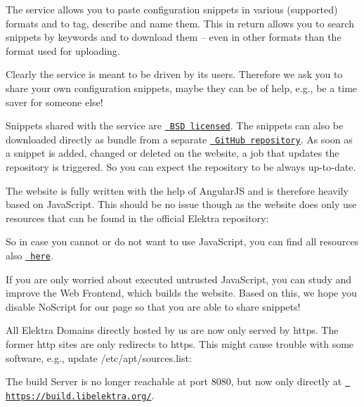 The service allows you to paste configuration snippets in various (supported) formats and to tag, describe and name them. This in return allows you to search snippets by keywords and to download them -- even in other formats than the format used for uploading.

Clearly the service is meant to be driven by its users. Therefore we ask you to share your own configuration snippets, maybe they can be of help, e.\+g., be a time saver for someone else!

Snippets shared with the service are \href{https://www.libelektra.org/devgettingstarted/license}{\texttt{ B\+SD licensed}}. The snippets can also be downloaded directly as bundle from a separate \href{https://github.com/ElektraInitiative/snippets}{\texttt{ Git\+Hub repository}}. As soon as a snippet is added, changed or deleted on the website, a job that updates the repository is triggered. So you can expect the repository to be always up-\/to-\/date.

The website is fully written with the help of Angular\+JS and is therefore heavily based on Java\+Script. This should be no issue though as the website does only use resources that can be found in the official Elektra repository\+:


\begin{DoxyEnumerate}
\item So in case you cannot or do not want to use Java\+Script, you can find all resources also \href{https://git.libelektra.org}{\texttt{ here}}.
\item If you are only worried about executed untrusted Java\+Script, you can study and improve the Web Frontend, which builds the website. Based on this, we hope you disable {\ttfamily No\+Script} for our page so that you are able to share snippets!
\end{DoxyEnumerate}

All Elektra Domains directly hosted by us are now only served by {\ttfamily https}. The former {\ttfamily http} sites are only redirects to {\ttfamily https}. This might cause trouble with some software, e.\+g., update {\ttfamily /etc/apt/sources.list}\+:


\begin{DoxyCode}{0}
\end{DoxyCode}


The build Server is no longer reachable at port 8080, but now only directly at \href{https://build.libelektra.org/}{\texttt{ https\+://build.\+libelektra.\+org/}}.

